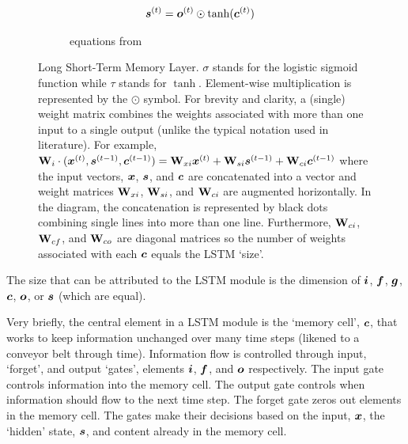 \begin{figure}[H]
\begin{subfigure}[]{\textwidth}
\begin{subequations}
\begin{align}
        \boldsymbol{s}\sp{(t)}
        &=
          \boldsymbol{o}\sp{(t)} \odot
          \tanh
          (
          \boldsymbol{c}\sp{(t)}
          )
      \end{align}
    \end{subequations}
    \caption{equations from \cite{Graves2013b}}
    \label{eqn:lstm}
  \end{subfigure}
  \caption[Long Short-Term Memory Layer]{Long Short-Term Memory Layer.
%
$\sigma$ stands for the logistic sigmoid function while $\tau$ stands for $\tanh$.
%
Element-wise multiplication is represented by the $\odot$ symbol.
%
For brevity and clarity, a (single) weight matrix combines the weights associated with more than one input to a single output (unlike the typical notation used in literature).
%
For example, $\mathbf{W}_i \cdot(\boldsymbol{x}\sp{(t)},\boldsymbol{s}\sp{(t-1)},\boldsymbol{c}\sp{(t-1)})=\mathbf{W}_{xi}\boldsymbol{x}\sp{(t)}+\mathbf{W}_{si}\boldsymbol{s}\sp{(t-1)}+\mathbf{W}_{ci}\boldsymbol{c}\sp{(t-1)}$ where the input vectors, $\boldsymbol{x}$, $\boldsymbol{s}$, and $\boldsymbol{c}$ are concatenated into a vector  and weight matrices $\mathbf{W}_{xi}$, $\mathbf{W}_{si}$, and $\mathbf{W}_{ci}$ are augmented horizontally. %
%
In the diagram, the concatenation is represented by black dots combining single lines into more than one line.
%
Furthermore, $\mathbf{W}_{ci}$, $\mathbf{W}_{cf}$, and $\mathbf{W}_{co}$ are diagonal matrices so the number of weights associated with each $\boldsymbol{c}$ equals the LSTM `size'.
}
  \label{fig:lstmfig}
\end{figure}


The size that can be attributed to the LSTM module is the dimension of $\boldsymbol{i}$, $\boldsymbol{f}$, $\boldsymbol{g}$, $\boldsymbol{c}$, $\boldsymbol{o}$, or $\boldsymbol{s}$ (which are equal).


Very briefly, the central element in a LSTM module is the `memory cell', $\boldsymbol{c}$, that works to keep information unchanged over many time steps (likened to a conveyor belt through time).
%
Information flow is controlled through input, `forget', and output `gates', elements $\boldsymbol{i}$, $\boldsymbol{f}$, and $\boldsymbol{o}$ respectively.
%
The input gate controls information into the memory cell.
%
The output gate controls when information should flow to the next time step.
%
The forget gate zeros out elements in the memory cell.
%
The gates make their decisions based on the input, $\boldsymbol{x}$, the `hidden' state, $\boldsymbol{s}$, and content already in the memory cell.
%


